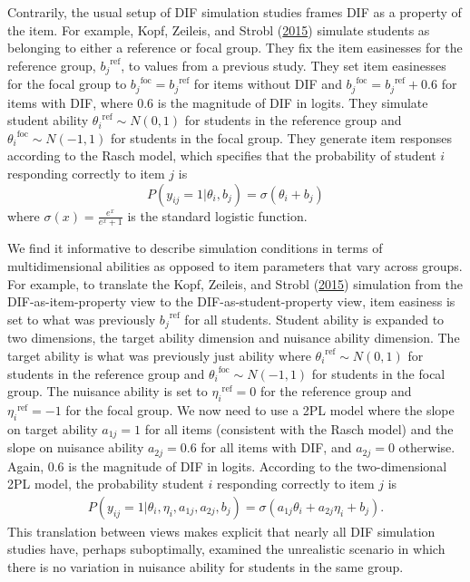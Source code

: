 \documentclass[
  11pt,
]{article}
\begin{document}
Contrarily, the usual setup of DIF simulation studies frames DIF as a property of the item. For example, Kopf, Zeileis, and Strobl (\protect\hyperlink{ref-kopf2015framework}{2015}) simulate students as belonging to either a reference or focal group. They fix the item easinesses for the reference group, \({b_j}^{\text{ref}}\), to values from a previous study. They set item easinesses for the focal group to \({b_j}^{\text{foc}} = {b_j}^{\text{ref}}\) for items without DIF and \({b_j}^{\text{foc}} = {b_j}^{\text{ref}} + 0.6\) for items with DIF, where 0.6 is the magnitude of DIF in logits. They simulate student ability \({\theta_i}^{\text{ref}} \sim N(0,1)\) for students in the reference group and \({\theta_i}^{\text{foc}} \sim N(-1,1)\) for students in the focal group. They generate item responses according to the Rasch model, which specifies that the probability of student \(i\) responding correctly to item \(j\) is \[P(y_{ij} = 1 | \theta_i, b_j) = \sigma(\theta_i + b_j)\] where \(\sigma(x) = \frac{e^x}{e^x + 1}\) is the standard logistic function.

We find it informative to describe simulation conditions in terms of multidimensional abilities as opposed to item parameters that vary across groups. For example, to translate the Kopf, Zeileis, and Strobl (\protect\hyperlink{ref-kopf2015framework}{2015}) simulation from the DIF-as-item-property view to the DIF-as-student-property view, item easiness is set to what was previously \({b_j}^{\text{ref}}\) for all students. Student ability is expanded to two dimensions, the target ability dimension and nuisance ability dimension. The target ability is what was previously just ability where \({\theta_i}^{\text{ref}} \sim N(0,1)\) for students in the reference group and \({\theta_i}^{\text{foc}} \sim N(-1,1)\) for students in the focal group. The nuisance ability is set to \({\eta_i}^{\text{ref}} = 0\) for the reference group and \({\eta_i}^{\text{ref}} = -1\) for the focal group. We now need to use a 2PL model where the slope on target ability \(a_{1j} = 1\) for all items (consistent with the Rasch model) and the slope on nuisance ability \(a_{2j} = 0.6\) for all items with DIF, and \(a_{2j} = 0\) otherwise. Again, 0.6 is the magnitude of DIF in logits. According to the two-dimensional 2PL model, the probability student \(i\) responding correctly to item \(j\) is
\begin{align}
    P(y_{ij} = 1 | \theta_i, \eta_i, a_{1j}, a_{2j}, b_j) = \sigma(a_{1j}\theta_i + a_{2j}\eta_i + b_j).
\end{align}
This translation between views makes explicit that nearly all DIF simulation studies have, perhaps suboptimally, examined the unrealistic scenario in which there is no variation in nuisance ability for students in the same group.
\end{document}
